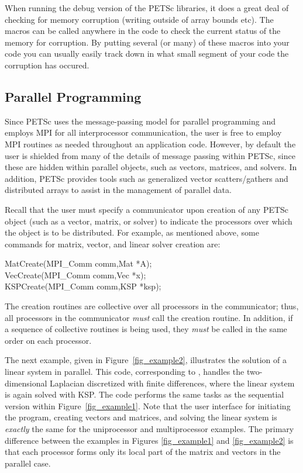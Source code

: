 When running the debug version of the PETSc libraries, it
does a great deal of checking for memory corruption (writing outside of 
array bounds etc). The macros  can be called 
anywhere in the code to check the current status of the memory for corruption.
By putting several (or many) of these macros into your code you can usually 
easily track down in what small segment of your code the corruption has occured.

\subsection*{Parallel Programming}

Since PETSc uses the message-passing model for
parallel programming and employs MPI for all interprocessor
communication, the user is free to employ MPI routines as needed
throughout an application code.  However, by default the user is
shielded from many of the details of message passing within PETSc,
since these are hidden within parallel objects, such as vectors,
matrices, and solvers.  In addition, PETSc provides tools such as
generalized vector scatters/gathers and distributed arrays to assist
in the management of parallel data.

Recall that the user must specify a communicator upon creation of any
PETSc object (such as a vector, matrix, or solver) to indicate the
processors over which the object is to be distributed.  For example,
as mentioned above, some commands for matrix, vector, and linear solver
creation are:
\begin{tabbing}
  MatCreate(MPI\_Comm comm,Mat *A);\\
  VecCreate(MPI\_Comm comm,Vec *x);\\
  KSPCreate(MPI\_Comm comm,KSP *ksp); 
\end{tabbing}
The creation routines are collective over all processors in the
communicator; thus, all processors in the communicator {\em must}
call the creation routine.  In addition, if a sequence of
collective routines is being used, they {\em must} be called
in the same order on each processor.

The next example, given in Figure~\ref{fig_example2}, illustrates the
solution of a linear system in parallel.  This code, corresponding to
, handles the
two-dimensional Laplacian discretized with finite differences, where
the linear system is again solved with KSP.  The code performs the
same tasks as the sequential version within Figure~\ref{fig_example1}.
Note that the user interface for initiating the program, creating
vectors and matrices, and solving the linear system is {\em exactly}
the same for the uniprocessor and multiprocessor examples.  The
primary difference between the examples in Figures \ref{fig_example1}
and \ref{fig_example2} is that each processor forms only its local
part of the matrix and vectors in the parallel case.

